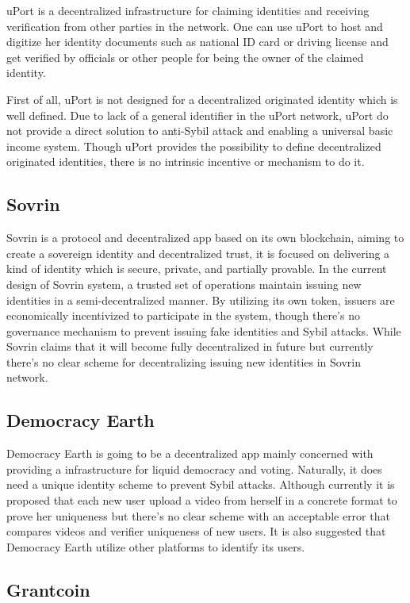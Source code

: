 \documentclass[conference]{IEEEtran}
\begin{document}
uPort is a decentralized infrastructure for claiming identities and receiving verification from other parties in the network. One can use uPort to host and digitize her identity documents such as national ID card or driving license and get verified by officials or other people for being the owner of the claimed identity.


 First of all, uPort is not designed for a decentralized originated identity which is well defined. Due to lack of a general identifier in the uPort network, uPort do not provide a direct solution to anti-Sybil attack and enabling a universal basic income system. Though uPort provides the possibility to define decentralized originated identities, there is no intrinsic incentive or mechanism to do it.

\subsection{Sovrin}

Sovrin is a protocol and decentralized app based on its own blockchain, aiming to create a sovereign identity and decentralized trust, it is focused on delivering a kind of identity which is secure, private, and partially provable. In the current design of Sovrin system, a trusted set of operations maintain issuing new identities in a semi-decentralized manner. By utilizing its own token, issuers are economically incentivized to participate in the system, though there’s no governance mechanism to prevent issuing fake identities and Sybil attacks. While Sovrin claims that it will become fully decentralized in future but currently there’s no clear scheme for decentralizing issuing new identities in Sovrin network. 

\subsection{Democracy Earth}
Democracy Earth is going to be a decentralized app mainly concerned with providing a infrastructure for liquid democracy and voting. Naturally, it does need a unique identity scheme to prevent Sybil attacks. Although currently it is proposed that each new user upload a video from herself in a concrete format to prove her uniqueness but there’s no clear scheme with an acceptable error that compares videos and verifier uniqueness of new users. It is also suggested that Democracy Earth utilize other platforms to identify its users.
\subsection{Grantcoin}
\end{document}
